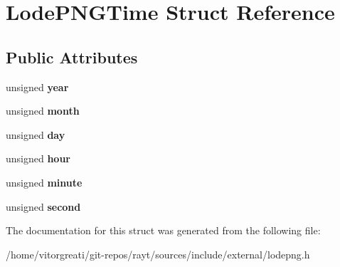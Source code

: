 \hypertarget{struct_lode_p_n_g_time}{}\section{Lode\+P\+N\+G\+Time Struct Reference}
\label{struct_lode_p_n_g_time}
\subsection*{Public Attributes}
\begin{DoxyCompactItemize}
\item 
\mbox{\label{struct_lode_p_n_g_time_a32b68342f39f3d38ba91a721b1149b8f}} 
unsigned {\bfseries year}
\item 
\mbox{\label{struct_lode_p_n_g_time_a295d890e862d5cd0c444e9d3a96fa9d5}} 
unsigned {\bfseries month}
\item 
\mbox{\label{struct_lode_p_n_g_time_aa3dee3b7b3a1e730fbded7a7b8cf355e}} 
unsigned {\bfseries day}
\item 
\mbox{\label{struct_lode_p_n_g_time_ac99cb7f3ce16a85f9f505b7f5f6e0aa7}} 
unsigned {\bfseries hour}
\item 
\mbox{\label{struct_lode_p_n_g_time_ac3045de79728f29fc61f534b062e0f13}} 
unsigned {\bfseries minute}
\item 
\mbox{\label{struct_lode_p_n_g_time_a6c691c5821e828488a8bb8a90751a2f0}} 
unsigned {\bfseries second}
\end{DoxyCompactItemize}


The documentation for this struct was generated from the following file\+:\begin{DoxyCompactItemize}
\item 
/home/vitorgreati/git-\/repos/rayt/sources/include/external/lodepng.\+h\end{DoxyCompactItemize}
